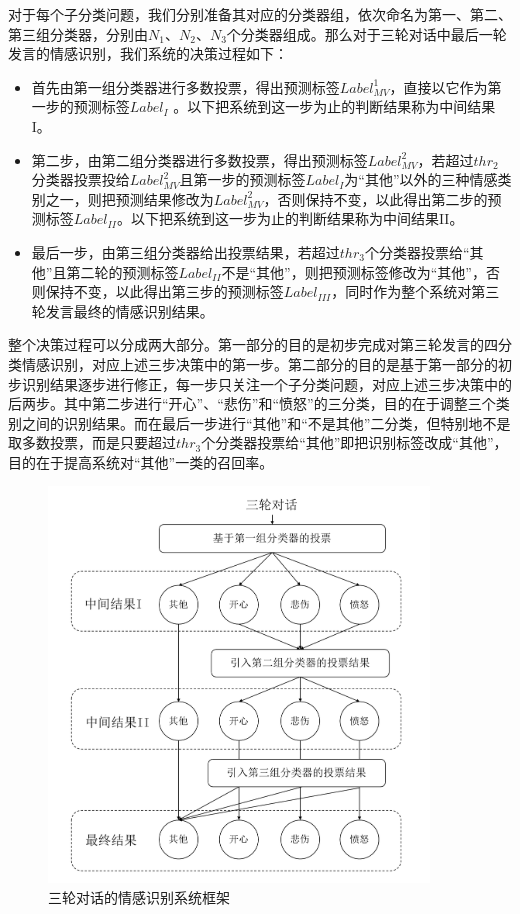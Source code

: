 对于每个子分类问题，我们分别准备其对应的分类器组，依次命名为第一、第二、第三组分类器，分别由$N_1$、$N_2$、$N_3$个分类器组成。那么对于三轮对话中最后一轮发言的情感识别，我们系统的决策过程如下：

\begin{itemize}

\item 首先由第一组分类器进行多数投票，得出预测标签$Label^{1}_{MV}$，直接以它作为第一步的预测标签$Label_{I}$ 。以下把系统到这一步为止的判断结果称为中间结果I。

\item 第二步，由第二组分类器进行多数投票，得出预测标签$Label^{2}_{MV}$，若超过$thr_{2}$分类器投票投给$Label^{2}_{MV}$且第一步的预测标签$Label_{I}$为“其他”以外的三种情感类别之一，则把预测结果修改为$Label^{2}_{MV}$，否则保持不变，以此得出第二步的预测标签$Label_{II}$。以下把系统到这一步为止的判断结果称为中间结果II。

\item 最后一步，由第三组分类器给出投票结果，若超过$thr_{3}$个分类器投票给“其他”且第二轮的预测标签$Label_{II}$不是“其他”，则把预测标签修改为“其他”，否则保持不变，以此得出第三步的预测标签$Label_{III}$，同时作为整个系统对第三轮发言最终的情感识别结果。

\end{itemize}

整个决策过程可以分成两大部分。第一部分的目的是初步完成对第三轮发言的四分类情感识别，对应上述三步决策中的第一步。第二部分的目的是基于第一部分的初步识别结果逐步进行修正，每一步只关注一个子分类问题，对应上述三步决策中的后两步。其中第二步进行“开心”、“悲伤”和“愤怒”的三分类，目的在于调整三个类别之间的识别结果。而在最后一步进行“其他”和“不是其他”二分类，但特别地不是取多数投票，而是只要超过$thr_{3}$个分类器投票给“其他”即把识别标签改成“其他”，目的在于提高系统对“其他”一类的召回率。

\begin{figure}[H]
  \centering
  \includegraphics[width=0.9\textwidth]{img/context_emo_system.pdf}
  \caption{三轮对话的情感识别系统框架}
  \label{fig:context_emo_system}
\end{figure}

